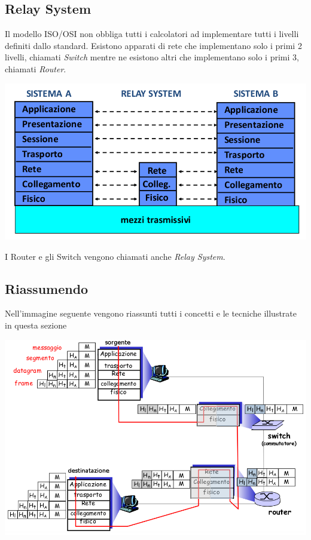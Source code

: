 \documentclass[12pt]{article}
\begin{document}
\clearpage
\subsection{Relay System}\label{relay-system}
Il modello ISO/OSI non obbliga tutti i calcolatori ad implementare tutti i livelli definiti dallo standard. Esistono apparati 
di rete che implementano solo i primi 2 livelli, chiamati \textit{Switch} mentre ne esistono altri che implementano solo i 
primi 3, chiamati \textit{Router}.
\begin{center}
	\includegraphics[scale=0.45]{introduzione-img14.png}
\end{center}
I Router e gli Switch vengono chiamati anche \textit{Relay System}.

\subsection{Riassumendo}\label{riassumendo}
Nell'immagine seguente vengono riassunti tutti i concetti e le tecniche illustrate in questa sezione
\begin{center}
	\includegraphics[scale=0.5]{introduzione-img15.png}
\end{center}
\end{document}
